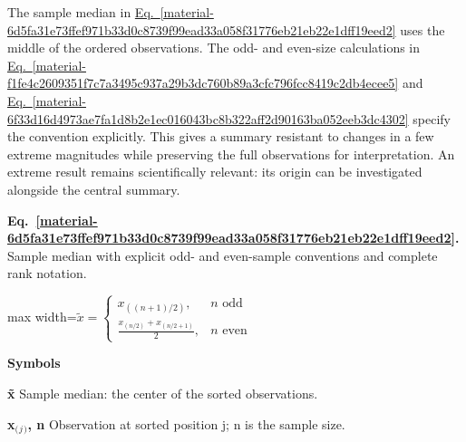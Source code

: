\documentclass[11pt,a4paper]{article}
\begin{document}
\medskip

The sample median in \hyperref[material-6d5fa31e73ffef971b33d0c8739f99ead33a058f31776eb21eb22e1dff19eed2]{Eq.~\ref*{material-6d5fa31e73ffef971b33d0c8739f99ead33a058f31776eb21eb22e1dff19eed2}} uses the middle of the ordered observations. The odd- and even-size calculations in \hyperref[material-f1fe4c2609351f7c7a3495c937a29b3dc760b89a3cfc796fcc8419c2db4ecee5]{Eq.~\ref*{material-f1fe4c2609351f7c7a3495c937a29b3dc760b89a3cfc796fcc8419c2db4ecee5}} and \hyperref[material-6f33d16d4973ae7fa1d8b2e1ec016043bc8b322aff2d90163ba052eeb3dc4302]{Eq.~\ref*{material-6f33d16d4973ae7fa1d8b2e1ec016043bc8b322aff2d90163ba052eeb3dc4302}} specify the convention explicitly. This gives a summary resistant to changes in a few extreme magnitudes while preserving the full observations for interpretation. An extreme result remains scientifically relevant: its origin can be investigated alongside the central summary.


\par\medskip
\noindent\begin{minipage}{\linewidth}
\label{material-6d5fa31e73ffef971b33d0c8739f99ead33a058f31776eb21eb22e1dff19eed2}
\noindent\textbf{Eq.~\ref*{material-6d5fa31e73ffef971b33d0c8739f99ead33a058f31776eb21eb22e1dff19eed2}.} Sample median with explicit odd- and even-sample conventions and complete rank notation.\par\nopagebreak
\begin{center}\begin{adjustbox}{max width=\linewidth}$\displaystyle \tilde{x}=\begin{cases}x_{((n+1)/2)}, & n\text{ odd}\\\frac{x_{(n/2)}+x_{(n/2+1)}}{2}, & n\text{ even}\end{cases}$\end{adjustbox}\end{center}

\par\noindent\textbf{Symbols}

\par\noindent\textbf{x̃} Sample median: the center of the sorted observations.

\par\noindent\textbf{x\ensuremath{{}_{(}}\ensuremath{{}_j}\ensuremath{{}_{)}}, n} Observation at sorted position j; n is the sample size.

\end{minipage}\par
\medskip
\end{document}
